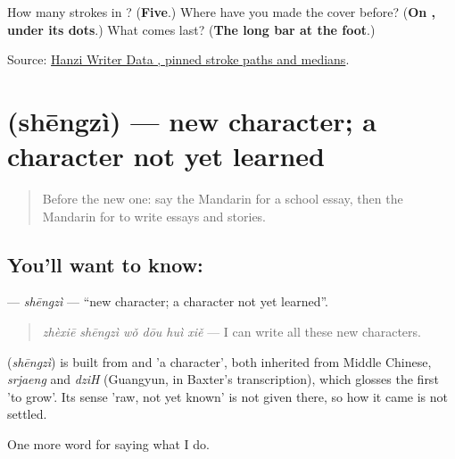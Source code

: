 \begin{tcolorbox}[breakable,colback=teal!4,colframe=teal!35!black,title={Before you move on}]
How many strokes in ? (\textbf{Five}.) Where have you made the cover before? (\textbf{On , under its dots}.) What comes last? (\textbf{The long bar at the foot}.)

Source: \href{https://raw.githubusercontent.com/chanind/hanzi-writer-data/68d10a4b21150cae5e1ebbd223eed289cf32d90c/data/\%E5\%86\%99.json}{Hanzi Writer Data , pinned stroke paths and medians}.
\end{tcolorbox}
\section[\texorpdfstring{\zh{生字} (shēngzì)}{生字 (shēngzì)}]{ (shēngzì) — new character; a character not yet learned}

\label{lesson:ZH-C251-shengzi}



\begin{quote}
Before the new one: say the Mandarin for a school essay, then the Mandarin for to write essays and stories.
\end{quote}

\subsection*{You'll want to know: }
\textbf{} — \emph{shēngzì} — \textquotedblleft{}new character; a character not yet learned\textquotedblright{}.

\begin{quote}
\textbf{} \emph{zhèxiē shēngzì wǒ dōu huì xiě} — I can write all these new characters.
\end{quote}

\begin{cousinweb}
\textbf{} (\emph{shēngzì}) is built from  and  'a character', both inherited from Middle Chinese, \emph{srjaeng} and \emph{dziH} (Guangyun, in Baxter's transcription), which glosses the first 'to grow'. Its sense 'raw, not yet known' is not given there, so how it came is not settled.
\end{cousinweb}

\begin{grammarlens}[title={What you've built}]
One more word for saying what I do.
\end{grammarlens}

